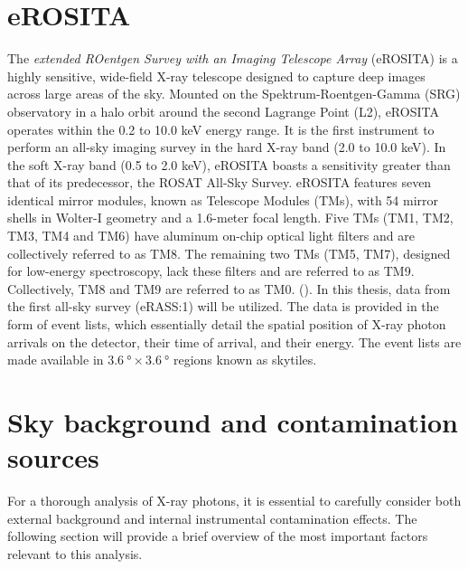 \section{eROSITA}
The \textit{extended ROentgen Survey with an Imaging Telescope Array} (eROSITA) is a highly sensitive, wide-field X-ray telescope designed to capture deep images across large areas of the sky. Mounted on the Spektrum-Roentgen-Gamma (SRG) observatory in a halo orbit around the second Lagrange Point (L2), eROSITA operates within the 0.2 to 10.0 keV energy range. It is the first instrument to perform an all-sky imaging survey in the hard X-ray band (2.0 to 10.0 keV). In the soft X-ray band (0.5 to 2.0 keV), eROSITA boasts a sensitivity greater than that of its predecessor, the ROSAT All-Sky Survey. eROSITA features seven identical mirror modules, known as Telescope Modules (TMs), with 54 mirror shells in Wolter-I geometry and a 1.6-meter focal length. Five TMs (TM1, TM2, TM3, TM4 and TM6) have aluminum on-chip optical light filters and are collectively referred to as TM8. The remaining two TMs (TM5, TM7), designed for low-energy spectroscopy, lack these filters and are referred to as TM9. Collectively, TM8 and TM9 are referred to as TM0. (\cite{Predehl2021}). In this thesis, data from the first all-sky survey (eRASS:1) will be utilized. The data is provided in the form of event lists, which essentially detail the spatial position of X-ray photon arrivals on the detector, their time of arrival, and their energy. The event lists are made available in \(\SI{3.6}{\degree}\times\SI{3.6}{\degree}\) regions known as skytiles.
\section{Sky background and contamination sources}\label{sec:background}
For a thorough analysis of X-ray photons, it is essential to carefully consider both external background and internal instrumental contamination effects. The following section will provide a brief overview of the most important factors relevant to this analysis.
